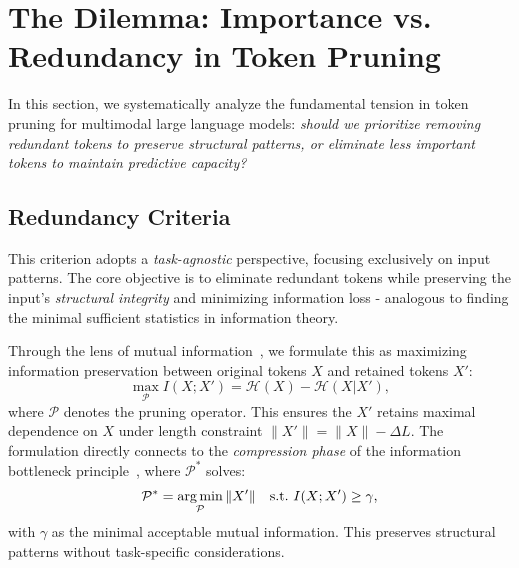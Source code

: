 \section{The \protect\boldmath{$\alpha$} Dilemma: Importance vs. Redundancy in Token Pruning}

In this section, we systematically analyze the fundamental tension in token pruning for multimodal large language models: \emph{should we prioritize removing redundant tokens to preserve structural patterns, or eliminate less important tokens to maintain predictive capacity?}

\subsection{Redundancy Criteria} %
\label{sec:Redundancy_criteria}
This criterion adopts a \emph{task-agnostic} perspective, focusing exclusively on input patterns. The core objective is to eliminate redundant tokens while preserving the input's \emph{structural integrity} and minimizing information loss - analogous to finding the minimal sufficient statistics in information theory.

Through the lens of mutual information~\citep{latham2009mutual}, we formulate this as maximizing information preservation between original tokens $X$ and retained tokens $X'$: %
\begin{equation}
    \max_{\mathcal{P}} I(X; X') = \mathcal{H}(X) - \mathcal{H}(X|X'),
\end{equation}
where $\mathcal{P}$ denotes the pruning operator. This ensures the $X'$ retains maximal dependence on $X$ under length constraint $\|X'\| = \|X\| - \Delta L$. The formulation directly connects to the \emph{compression phase} of the information bottleneck principle~\citep{tishby2000information}, where $\mathcal{P}^*$ solves:
\begin{equation}
    \mathcal{P}^* = \operatorname*{arg\,min}_{\mathcal{P}} \|X'\| \quad \text{s.t.} \ I(X;X') \geq \gamma,
\end{equation}
with $\gamma$ as the minimal acceptable mutual information. This preserves structural patterns without task-specific considerations.

